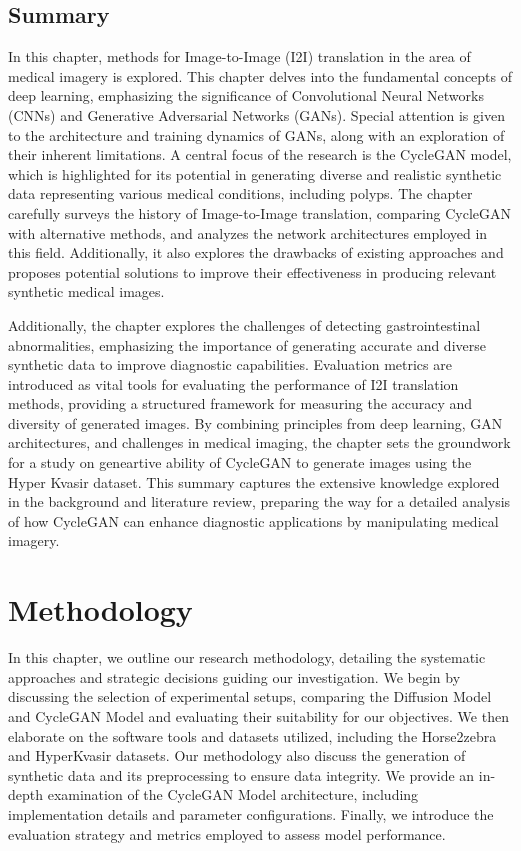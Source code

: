 \documentclass[UKenglish,12pt]{master-style}
\begin{document}
\section{Summary}

In this chapter, methods for Image-to-Image (I2I) translation in the area of medical imagery is explored. This chapter delves into the fundamental concepts of deep learning, emphasizing the significance of Convolutional Neural Networks (CNNs) and Generative Adversarial Networks (GANs). Special attention is given to the architecture and training dynamics of GANs, along with an exploration of their inherent limitations. A central focus of the research is the CycleGAN model, which is highlighted for its potential in generating diverse and realistic synthetic data representing various medical conditions, including polyps. The chapter carefully surveys the history of Image-to-Image translation, comparing CycleGAN with alternative methods, and analyzes the network architectures employed in this field. Additionally, it also explores the drawbacks of existing approaches and proposes potential solutions to improve their effectiveness in producing relevant synthetic medical images. 

Additionally, the chapter explores the challenges of detecting gastrointestinal abnormalities, emphasizing the importance of generating accurate and diverse synthetic data to improve diagnostic capabilities. Evaluation metrics are introduced as vital tools for evaluating the performance of I2I translation methods, providing a structured framework for measuring the accuracy and diversity of generated images. By combining principles from deep learning, GAN architectures, and challenges in medical imaging, the chapter sets the groundwork for a study on geneartive ability of CycleGAN  to generate images using the Hyper Kvasir dataset. This summary captures the extensive knowledge explored in the background and literature review, preparing the way for a detailed analysis of how CycleGAN can enhance diagnostic applications by manipulating medical imagery.

\chapter{Methodology}

In this chapter, we outline our research methodology, detailing the systematic approaches and strategic decisions guiding our investigation. We begin by discussing the selection of experimental setups, comparing the Diffusion Model and CycleGAN Model and evaluating their suitability for our objectives. We then elaborate on the software tools and datasets utilized, including the Horse2zebra and HyperKvasir datasets. Our methodology also discuss the generation of synthetic data and its preprocessing to ensure data integrity. We provide an in-depth examination of the CycleGAN Model architecture, including implementation details and parameter configurations. Finally, we introduce the evaluation strategy and metrics employed to assess model performance.
\end{document}
